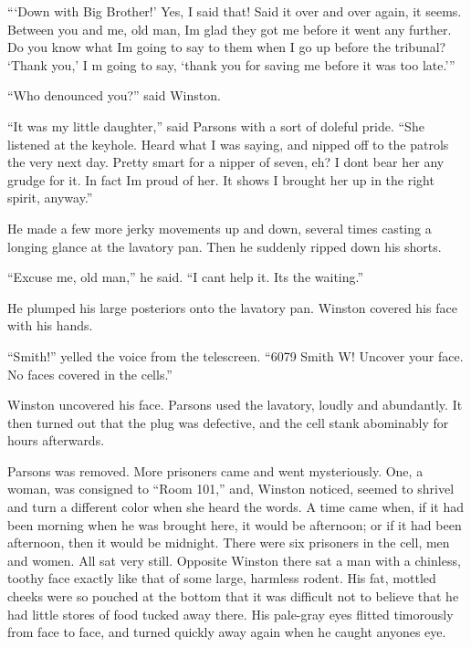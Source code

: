 ```Down with Big Brother!' Yes, I said that! Said it over and over again, it
seems. Between you and me, old man, I\textquotesingle m glad they got me
before it went any further. Do you know what I\textquotesingle m going to
say to them when I go up before the tribunal? `Thank you,' I\textquotesingle
m going to say, `thank you for saving me before it was too
late.'{}''

``Who denounced you?'' said Winston.

``It was my little daughter,'' said Parsons with a sort of doleful pride.
``She listened at the keyhole. Heard what I was saying, and nipped off to
the patrols the very next day. Pretty smart for a nipper of seven, eh? I
don\textquotesingle t bear her any grudge for it. In fact
I\textquotesingle m proud of her. It shows I brought her up in the right
spirit, anyway.''

He made a few more jerky movements up and down, several times casting a
longing glance at the lavatory pan. Then he suddenly ripped down his
shorts.

``Excuse me, old man,'' he said. ``I can\textquotesingle t help it.
It\textquotesingle s the waiting.''

He plumped his large posteriors onto the lavatory pan. Winston covered
his face with his hands.

``Smith!'' yelled the voice from the telescreen. ``6079 Smith W! Uncover
your face. No faces covered in the cells.''

Winston uncovered his face. Parsons used the lavatory, loudly and
abundantly. It then turned out that the plug was defective, and the cell
stank abominably for hours afterwards.

Parsons was removed. More prisoners came and went mysteriously. One, a
woman, was consigned to ``Room 101,'' and, Winston noticed, seemed to
shrivel and turn a different color when she heard the words. A time came
when, if it had been morning when he was brought here, it would be
afternoon; or if it had been afternoon, then it would be midnight. There
were six prisoners in the cell, men and women. All sat very still.
Opposite Winston there sat a man with a chinless, toothy face exactly
like that of some large, harmless rodent. His fat, mottled cheeks were
so pouched at the bottom that it was difficult not to believe that he
had little stores of food tucked away there. His pale-gray eyes flitted
timorously from face to face, and turned quickly away again when he
caught anyone\textquotesingle s eye.

